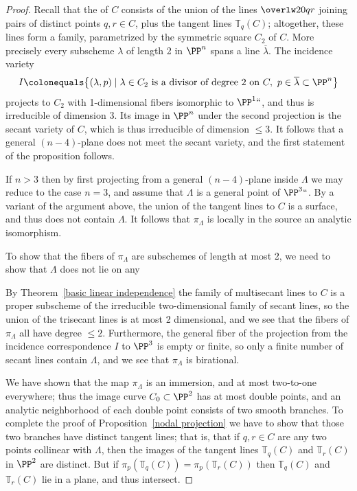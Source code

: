 \begin{proof} Recall that the 
%
of $C$ consists of the
union of the lines $\overlw20{qr}$ joining pairs of distinct points
$q,r \in C$, plus the tangent lines ${\mathbb T}_q(C)$; altogether,
these lines form a family, parametrized by the symmetric square $C_2$
of $C$. More precisely every subscheme $\lambda$ of
length 2 in $\PP^n$ spans a line $\overline \lambda$. The incidence
variety
$$
I\colonequals \bigl\{(\lambda, p)\mid \lambda\in C_2 \hbox{ is a divisor of
degree 2 on }C,\ p\in \overline \lambda\subset\PP^n\bigr\}
$$
projects to $C_2$ with 1-dimensional fibers isomorphic to $\PP^1` `$,
and thus
is irreducible of dimension 3. Its image in $\PP^n$ under the second
projection
is the secant variety of $C$, which is thus irreducible of dimension
$\leq 3$.
It follows that a general
$(n-4)$-plane does not meet the secant variety, and the first statement
of the proposition follows.

If $n>3$ then by first projecting from a general $(n-4)$-plane inside
$\Lambda$ we may reduce to the case $n=3$, and assume that $\Lambda$ is a
general point of $\PP^3` `$. By a variant of the argument above, the union
of the tangent lines to $C$ is a surface, and thus does not contain
$\Lambda$.
It follows that $\pi_\Lambda$ is locally in the source an analytic
isomorphism.

To show that the fibers of $\pi_\Lambda$ are subschemes of length at
most 2,
we need to show that $\Lambda$ does not lie on any 
%

By Theorem~\ref{basic linear independence} the family of multisecant
lines to $C$ is a proper subscheme of the irreducible two-dimensional
family of secant lines, so the union of the trisecant lines is at most 2
dimensional, and we see that the fibers of $\pi_\Lambda$ all have degree
$\leq 2$. Furthermore, the general fiber of the projection
from the incidence correspondence $I$ to $\PP^3$ is empty or finite,
so only a finite number of secant lines contain $\Lambda$, and we see
that $\pi_\Lambda$ is birational.

We have shown that the map $\pi_\Lambda$ is an immersion, and at
most two-to-one everywhere; thus the image curve $C_0 \subset \PP^2$
has at most double points, and an analytic neighborhood of each
double point  consists of two smooth branches. To complete the proof
of Proposition~\ref{nodal projection} we have to show that those two
branches have distinct tangent lines; that is, that
if $q, r \in C$ are any two points collinear with $\Lambda$, then the
images of the tangent lines ${\mathbb T}_q(C)$ and ${\mathbb T}_r(C)$ in
$\PP^2$ are distinct. But if  $\pi_p({\mathbb T}_q(C)) = \pi_p({\mathbb
T}_r(C))$ then  ${\mathbb T}_q(C)$ and ${\mathbb T}_r(C)$ lie in a plane,
and thus intersect.


\end{proof}
